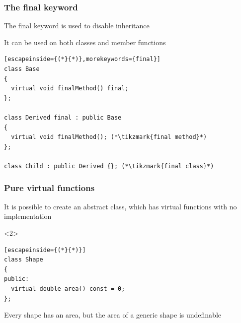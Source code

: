 \documentclass[14pt,a4paper,dvipsnames,usenames]{beamer}
\begin{document}
\begin{frame}[fragile]
  \frametitle{The {\color{FeebleWeek}final} keyword}

  The {\color{FeebleWeek}final} keyword is used to {\color{Marty}disable} inheritance

  \vspace{.2cm}
  It can be used on both classes and member functions

  \vspace{.2cm}
  \begin{lstlisting}[escapeinside={(*}{*)},morekeywords={final}]
class Base
{
  virtual void finalMethod() final;
};

class Derived final : public Base
{
  virtual void finalMethod(); (*\tikzmark{final method}*)
};

class Child : public Derived {}; (*\tikzmark{final class}*)
  \end{lstlisting}

  \nointerlineskip
  
  \CPPEleven
  
\end{frame}

\begin{frame}[fragile]
  \frametitle{Pure virtual functions}

  It is possible to create an {\color{Tropiteal}abstract} class, which has virtual functions with no implementation

  
  \begin{onlyenv}<2>
  \vspace{.5cm}
  \begin{lstlisting}[escapeinside={(*}{*)}]
class Shape
{
public:
  virtual double area() const = 0;
};
  \end{lstlisting}
    
  \vspace{.5cm}
  {
    Every shape has an area, but the area of a generic shape is undefinable
  }
  \end{onlyenv}
  
\end{frame}
\end{document}

